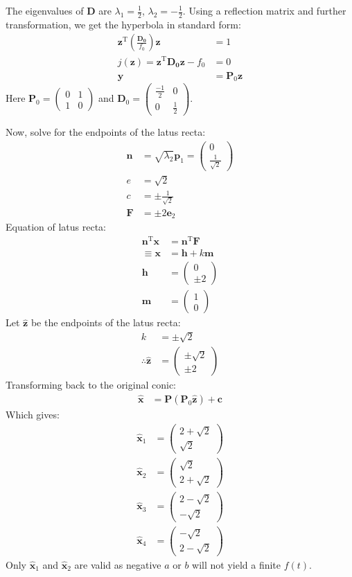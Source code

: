 \documentclass[conference]{IEEEtran}
\theoremstyle{remark}
\providecommand{\brak}[1]{\ensuremath{\left(#1\right)}}
\newcommand{\myvec}[1]{\ensuremath{\begin{pmatrix}#1\end{pmatrix}}}
\renewcommand{\vec}[1]{\boldsymbol{\mathbf{#1}}}
\begin{document}
	The eigenvalues of $\vec{D}$ are $\lambda_1 = \frac{1}{2}$, $\lambda_2=-\frac{1}{2}$. Using a reflection matrix and further transformation, we get the hyperbola in standard form:
	\begin{align}
		\vec{z}^\text{T}\brak{\frac{\vec{D_0}}{f_0}}\vec{z} &= 1\\
		j(\vec{z}) = \vec{z}^\text{T}\vec{D_0}\vec{z} - f_0 &= 0  \label{standard_conic}\\
		\vec{y} &= \vec{P}_0\vec{z} \label{t2}
	\end{align}
	Here $\vec{P}_0 = \myvec{0 & 1 \\ 1 & 0}$ and $\vec{D}_0 = \myvec{\frac{-1}{2} & 0 \\ 0 & \frac{1}{2}}$.
	
	Now, solve for the endpoints of the latus recta:
	\begin{align}
		\vec{n} &= \sqrt{\lambda_2}\vec{p}_1 = \myvec{0 \\ \frac{1}{\sqrt{2}}}\\
		e &= \sqrt{2}\\
		c &= \pm \frac{1}{\sqrt{2}}\\
		\vec{F} &= \pm 2 \vec{e}_2
	\end{align}
	Equation of latus recta:
	\begin{align}
		\vec{n}^\text{T}\vec{x} &= \vec{n}^\text{T}\vec{F}\\
		\equiv \vec{x} &= \vec{h} + k\vec{m} \label{latus_rectum}\\
		\vec{h} &= \myvec{0 \\ \pm 2}\\
		\vec{m} &= \myvec{1 \\ 0}
	\end{align}
	Let $\vec{\hat{z}}$ be the endpoints of the latus recta:
	\begin{align}
		k &= \pm \sqrt{2}\\
		\therefore \vec{\hat{z}} &= \myvec{\pm \sqrt{2} \\ \pm 2}
	\end{align}
	Transforming back to the original conic:
	\begin{align}
		\vec{\hat{x}} &= \vec{P}\brak{\vec{P}_0 \vec{\hat{z}}} + \vec{c}
	\end{align}
	Which gives:
	\begin{align}
		\vec{\hat{x}}_1 &= \myvec{2+\sqrt{2} \\ \sqrt{2}}\\
		\vec{\hat{x}}_2 &= \myvec{\sqrt{2} \\ 2+\sqrt{2}}\\
		\vec{\hat{x}}_3 &= \myvec{2-\sqrt{2} \\ -\sqrt{2}}\\
		\vec{\hat{x}}_4 &= \myvec{-\sqrt{2} \\ 2-\sqrt{2}}
	\end{align}
	Only $\vec{\hat{x}}_1$ and $\vec{\hat{x}}_2$ are valid as negative $a$ or $b$ will not yield a finite $f(t)$.
	
\end{document}
